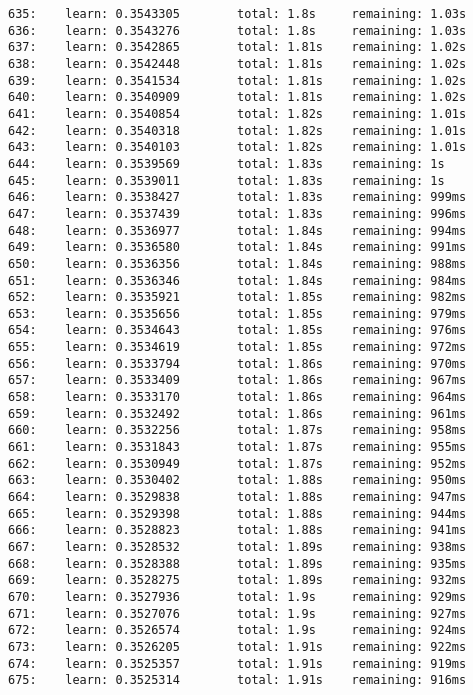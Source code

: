 \documentclass[11pt]{article}
\begin{document}
\begin{Verbatim}[commandchars=\\\{\}]
635:    learn: 0.3543305        total: 1.8s     remaining: 1.03s
636:    learn: 0.3543276        total: 1.8s     remaining: 1.03s
637:    learn: 0.3542865        total: 1.81s    remaining: 1.02s
638:    learn: 0.3542448        total: 1.81s    remaining: 1.02s
639:    learn: 0.3541534        total: 1.81s    remaining: 1.02s
640:    learn: 0.3540909        total: 1.81s    remaining: 1.02s
641:    learn: 0.3540854        total: 1.82s    remaining: 1.01s
642:    learn: 0.3540318        total: 1.82s    remaining: 1.01s
643:    learn: 0.3540103        total: 1.82s    remaining: 1.01s
644:    learn: 0.3539569        total: 1.83s    remaining: 1s
645:    learn: 0.3539011        total: 1.83s    remaining: 1s
646:    learn: 0.3538427        total: 1.83s    remaining: 999ms
647:    learn: 0.3537439        total: 1.83s    remaining: 996ms
648:    learn: 0.3536977        total: 1.84s    remaining: 994ms
649:    learn: 0.3536580        total: 1.84s    remaining: 991ms
650:    learn: 0.3536356        total: 1.84s    remaining: 988ms
651:    learn: 0.3536346        total: 1.84s    remaining: 984ms
652:    learn: 0.3535921        total: 1.85s    remaining: 982ms
653:    learn: 0.3535656        total: 1.85s    remaining: 979ms
654:    learn: 0.3534643        total: 1.85s    remaining: 976ms
655:    learn: 0.3534619        total: 1.85s    remaining: 972ms
656:    learn: 0.3533794        total: 1.86s    remaining: 970ms
657:    learn: 0.3533409        total: 1.86s    remaining: 967ms
658:    learn: 0.3533170        total: 1.86s    remaining: 964ms
659:    learn: 0.3532492        total: 1.86s    remaining: 961ms
660:    learn: 0.3532256        total: 1.87s    remaining: 958ms
661:    learn: 0.3531843        total: 1.87s    remaining: 955ms
662:    learn: 0.3530949        total: 1.87s    remaining: 952ms
663:    learn: 0.3530402        total: 1.88s    remaining: 950ms
664:    learn: 0.3529838        total: 1.88s    remaining: 947ms
665:    learn: 0.3529398        total: 1.88s    remaining: 944ms
666:    learn: 0.3528823        total: 1.88s    remaining: 941ms
667:    learn: 0.3528532        total: 1.89s    remaining: 938ms
668:    learn: 0.3528388        total: 1.89s    remaining: 935ms
669:    learn: 0.3528275        total: 1.89s    remaining: 932ms
670:    learn: 0.3527936        total: 1.9s     remaining: 929ms
671:    learn: 0.3527076        total: 1.9s     remaining: 927ms
672:    learn: 0.3526574        total: 1.9s     remaining: 924ms
673:    learn: 0.3526205        total: 1.91s    remaining: 922ms
674:    learn: 0.3525357        total: 1.91s    remaining: 919ms
675:    learn: 0.3525314        total: 1.91s    remaining: 916ms

\end{Verbatim}
\end{document}

